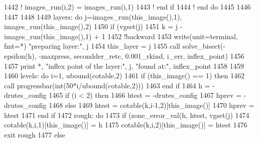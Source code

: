 \begin{DoxyCode}
1442 \textcolor{comment}{!         images\_run(i,2) = images\_run(i,1)}
1443 \textcolor{comment}{!       end if}
1444 \textcolor{comment}{!       end do}
1445 
1446 
1447     
1448 
1449       layers: \textcolor{keywordflow}{do} j=images\_run(this\_image(),1), images\_run(this\_image(),2\textcolor{comment}{)}
1450 \textcolor{comment}{                }\textcolor{keywordflow}{if} (vgset(j)%
1451                   k = j - images\_run(this\_image(),1) + 1
1452                   \textcolor{comment}{!backward}
1453                   \textcolor{keyword}{write}(unit=terminal, fmt=*) \textcolor{stringliteral}{"preparing layer:"}, j
1454                   this_layer = j
1455                   \textcolor{keyword}{call }solve_bisect(-epsilon(h), -maxpress, secondder_retc, 0.001\_rkind\textcolor{comment}{, i\_err, 
      inflex\_point)}
1456 \textcolor{comment}{}
1457 \textcolor{comment}{                  print *, }\textcolor{stringliteral}{"inflex point of the layer:"}, j, \textcolor{stringliteral}{"found at:"}, inflex\_point
1458                   
1459 
1460                   levels: \textcolor{keywordflow}{do} i=1, ubound(cotable,2)
1461                             \textcolor{keywordflow}{if} (this\_image() == 1) \textcolor{keywordflow}{then}
1462                               \textcolor{keyword}{call }progressbar(int(50*i/ubound(cotable,2)))
1463 \textcolor{keywordflow}{                            end if}
1464                             h = -drutes_config%
1465                             \textcolor{keywordflow}{if} (i < 2) \textcolor{keywordflow}{then}
1466                               htest = -drutes_config%
1467                               hprev = -drutes_config%
1468                             \textcolor{keywordflow}{else}
1469                               htest = cotable(k,i-1,2)[this\_image()]
1470                               hprev = htest
1471 \textcolor{keywordflow}{                            end if}
1472                             rough: \textcolor{keywordflow}{do}
1473                                     \textcolor{keywordflow}{if} (zone_error_val(h, htest, vgset(j)%
1474                                                   cotable(k,i,1)[this\_image()] = h
1475                                                   cotable(k,i,2)[this\_image()] = htest
1476                                                   \textcolor{keywordflow}{exit} rough
1477                                     \textcolor{keywordflow}{else}

\end{DoxyCode}
